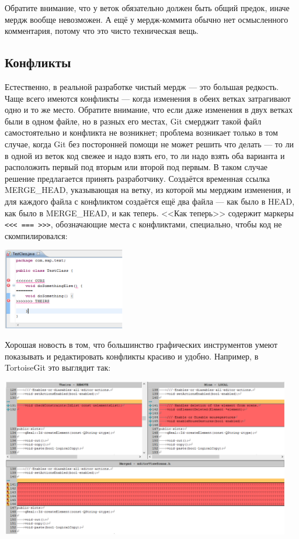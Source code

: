 \documentclass{../../text-style}
\begin{document}
Обратите внимание, что у веток обязательно должен быть общий предок, иначе мердж вообще невозможен. А ещё у мердж-коммита обычно нет осмысленного комментария, потому что это чисто техническая вещь.

\subsection{Конфликты}

Естественно, в реальной разработке чистый мердж --- это большая редкость. Чаще всего имеются конфликты --- когда изменения в обеих ветках затрагивают одно и то же место. Обратите внимание, что если даже изменения в двух ветках были в одном файле, но в разных его местах, Git смерджит такой файл самостоятельно и конфликта не возникнет; проблема возникает только в том случае, когда Git без посторонней помощи не может решить что делать --- то ли в одной из веток код свежее и надо взять его, то ли надо взять оба варианта и расположить первый под вторым или второй под первым. В таком случае решение предлагается принять разработчику. Создаётся временная ссылка MERGE\_HEAD, указывающая на ветку, из которой мы мерджим изменения, и для каждого файла с конфликтом создаётся ещё два файла --- как было в HEAD, как было в MERGE\_HEAD, и как теперь. <<Как теперь>> содержит маркеры \verb|<<< === >>>|, обозначающие места с конфликтами, специально, чтобы код не скомпилировался:

\begin{center}
    \includegraphics[width=0.4\textwidth]{conflictsInCode.png}
\end{center}

Хорошая новость в том, что большинство графических инструментов умеют показывать и редактировать конфликты красиво и удобно. Например, в TortoiseGit это выглядит так:

\begin{center}
    \includegraphics[width=0.95\textwidth]{conflicts.png}
\end{center}
\end{document}
